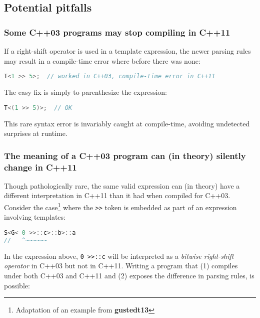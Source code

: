 \subsection[Potential pitfalls]{Potential pitfalls}\label{potential-pitfalls}

\subsubsection[Some C++03 programs may stop compiling in C++11]{Some C++03 programs may stop compiling in C++11}\label{some-c++03-programs-may-stop-working-in-c++11}

If a right-shift operator is used in a template expression, the newer
parsing rules may result in a compile-time error where before there was
none:

\begin{lstlisting}[language=C++]
T<1 >> 5>;  // worked in C++03, compile-time error in C++11
\end{lstlisting}

\noindent The easy fix is simply to parenthesize the expression:

\begin{lstlisting}[language=C++]
T<(1 >> 5)>;  // OK
\end{lstlisting}

\noindent This rare syntax error is invariably caught at compile-time, avoiding undetected surprises at runtime.

\subsubsection[The meaning of a C++03 program can (in theory) silently change in C++11]{The meaning of a C++03 program can (in theory) silently change in C++11}\label{the-meaning-of-a-c++03-program-can-(in-theory)-silently-change-in-c++11}

Though pathologically rare, the same valid expression can (in theory) have a different interpretation in C++11 than it had when compiled for C++03.
Consider the case{\cprotect\footnote{Adaptation of an example from \textbf{{gustedt13}}}} where the
\texttt{>>} token is embedded as part of an expression involving
templates:

\begin{lstlisting}[language=C++]
S<G< 0 >>::c>::b>::a
//   ^~~~~~~
\end{lstlisting}

\noindent In the expression above, \texttt{0}~\texttt{>>::c} will be interpreted
as a \emph{bitwise right-shift operator} in C++03 but not in C++11. Writing a program that (1) compiles under both C++03 and
C++11 and (2) exposes the difference in parsing rules, is possible:

